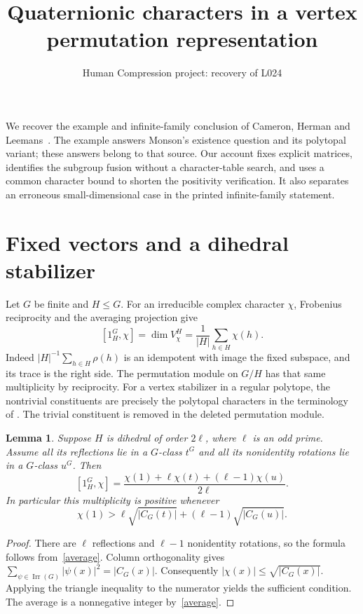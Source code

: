 \documentclass[11pt,a4paper]{article}
\title{Quaternionic characters in a vertex permutation representation}
\author{Human Compression project: recovery of L024}
\date{}
\newtheorem{lemma}[theorem]{Lemma}
\begin{document}
\maketitle
We recover the example and infinite-family conclusion of Cameron,
Herman and Leemans~\cite{CHL}. The example answers Monson's existence
question and its polytopal variant; these answers belong to that source.
Our account fixes explicit matrices, identifies the subgroup fusion
without a character-table search, and uses a common character bound
to shorten the positivity verification. It also separates an erroneous
small-dimensional case in the printed infinite-family statement.

\section{Fixed vectors and a dihedral stabilizer}
Let $G$ be finite and $H\le G$. For an irreducible complex character
$\chi$, Frobenius reciprocity and the averaging projection give
\begin{equation}\label{average}
 [1_H^G,\chi]=\dim V_\chi^H
 =\frac1{|H|}\sum_{h\in H}\chi(h).
\end{equation}
Indeed $|H|^{-1}\sum_{h\in H}\rho(h)$ is an idempotent with image
the fixed subspace, and its trace is the right side. The permutation
module on $G/H$ has that same multiplicity by reciprocity. For a
vertex stabilizer in a regular polytope, the nontrivial constituents
are precisely the polytopal characters in the terminology of
\cite{CHL}. The trivial constituent is removed in the deleted
permutation module.

\begin{lemma}\label{dihedral}
Suppose $H$ is dihedral of order $2\ell$, where $\ell$ is an odd prime.
Assume all its reflections lie in a $G$-class $t^G$ and all its
nonidentity rotations lie in a $G$-class $u^G$. Then
\[
 [1_H^G,\chi]=\frac{\chi(1)+\ell\chi(t)+(\ell-1)\chi(u)}{2\ell}.
\]
In particular this multiplicity is positive whenever
\[
 \chi(1)>\ell\sqrt{|C_G(t)|}+(\ell-1)\sqrt{|C_G(u)|}.
\]
\end{lemma}
\begin{proof}
There are $\ell$ reflections and $\ell-1$ nonidentity rotations,
so the formula follows from~\eqref{average}. Column orthogonality
gives $\sum_{\psi\in\operatorname{Irr}(G)}|\psi(x)|^2=|C_G(x)|$.
Consequently $|\chi(x)|\le\sqrt{|C_G(x)|}$. Applying the triangle
inequality to the numerator yields the sufficient condition. The
average is a nonnegative integer by~\eqref{average}.
\end{proof}
\end{document}
